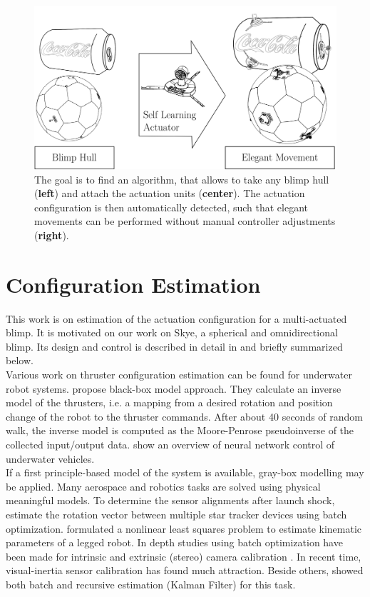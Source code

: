 \begin{figure}[hbtp]
\centering
\includegraphics[width=.85\linewidth]{images/intro/motivation.png}
\caption{The goal is to find an algorithm, that allows to take any blimp hull (\textbf{left}) and attach the actuation units (\textbf{center}).
The actuation configuration is then automatically detected, such that elegant movements can be performed without manual controller adjustments (\textbf{right}).}
\label{fig:motivation}
\end{figure}

\section{Configuration Estimation}
\label{sec:configuration_estimation}
This work is on estimation of the actuation configuration for a multi-actuated blimp.
It is motivated on our work on Skye, a spherical and omnidirectional blimp.
Its design and control is described in detail in \citep{Skye2013} and briefly summarized below. \\
Various work on thruster configuration estimation can be found for underwater robot systems.
 propose black-box model approach.
They calculate an inverse model of the thrusters, i.e. a mapping from a desired rotation and position change of the robot to the thruster commands. After about 40 seconds of random walk, the inverse model is computed as the Moore-Penrose pseudoinverse of the collected input/output data.
 show an overview of neural network control of underwater vehicles. \\ 
If a first principle-based model of the system is available, gray-box modelling may be applied.
Many aerospace and robotics tasks are solved using physical meaningful models.
To determine the sensor alignments after launch shock, \citet{Shuster1991} estimate the rotation vector between multiple star tracker devices using batch optimization.
 formulated a nonlinear least squares problem to estimate kinematic parameters of a legged robot.
In depth studies using batch optimization have been made for intrinsic and extrinsic (stereo) camera calibration \citep[chap. 4]{Siegwart}.
In recent time, visual-inertia sensor calibration has found much attraction.
Beside others, \citet{Hol2011} showed both batch and recursive estimation (Kalman Filter) for this task.

